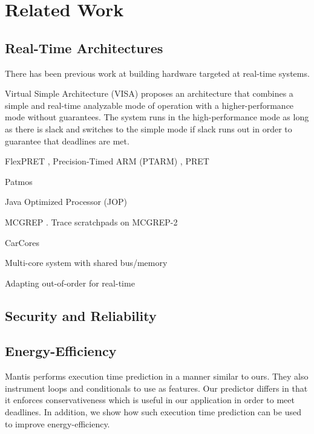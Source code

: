 \chapter{Related Work}
\label{chap:related_work}

\section{Real-Time Architectures}
\label{sec:related_work.realtime}

There has been previous work at building hardware targeted at real-time systems.

Virtual Simple Architecture (VISA) \cite{visa-isca03,
multi_task_visa-rtss04} proposes an architecture that combines a simple and
real-time analyzable mode of operation with a higher-performance mode
without guarantees. The system runs in the high-performance mode as long as
there is slack and switches to the simple mode if slack runs out in order to
guarantee that deadlines are met.

FlexPRET \cite{flexpret-rtas14}, Precision-Timed ARM (PTARM) \cite{ptarm-iccd12}, PRET \cite{pret-cases08, pret-dac07}

Patmos \cite{patmos-ppes2011}

Java Optimized Processor (JOP) \cite{jop-jsa07}

MCGREP \cite{mcgrep-rtss06}. Trace scratchpads on MCGREP-2 \cite{mcgrep2-rtas08}

CarCores \cite{carcores-arcs10}

Multi-core system with shared bus/memory \cite{paolieri-isca09}

Adapting out-of-order for real-time \cite{whitham-comp10}


\section{Security and Reliability}
\label{sec:related_work.security}

\section{Energy-Efficiency}
\label{sec:related_work.energy}

Mantis \cite{mantis-atc13} performs execution time prediction in a manner
similar to ours. They also instrument loops and conditionals to use as
features. Our predictor differs in that it enforces conservativeness which is
useful in our application in order to meet deadlines. In addition, we show how
such execution time prediction can be used to improve energy-efficiency.

